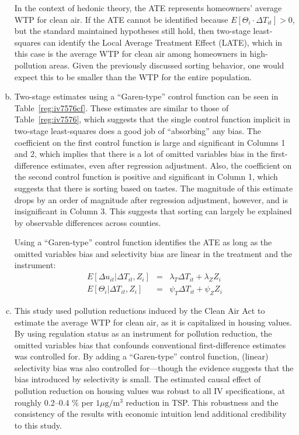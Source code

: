 \documentclass{article}
\begin{document}
\begin{enumerate}[(a)]
In the context of hedonic theory, the ATE represents homeowners' average WTP for clean air. If the ATE cannot be identified because $E\left[\Theta_{i} \cdot \Delta{}T_{it}\right]>0$, but the standard maintained hypotheses still hold, then two-stage least-squares can identify the Local Average Treatment Effect (LATE), which in this case is the average WTP for clean air among homeowners in high-pollution areas. Given the previously discussed sorting behavior, one would expect this to be smaller than the WTP for the entire population.

\item Two-stage estimates using a ``Garen-type'' control function can be seen in Table~\ref{reg:iv7576cf}. These estimates are similar to those of Table~\ref{reg:iv7576}, which suggests that the single control function implicit in two-stage least-squares does a good job of ``absorbing'' any bias. The coefficient on the first control function is large and significant in Columns 1 and 2, which implies that there is a lot of omitted variables bias in the first-difference estimates, even after regression adjustment. Also, the coefficient on the second control function is positive and significant in Column 1, which suggests that there is sorting based on tastes. The magnitude of this estimate drops by an order of magnitude after regression adjustment, however, and is insignificant in Column 3. This suggests that sorting can largely be explained by observable differences across counties.

Using a ``Garen-type'' control function identifies the ATE as long as the omitted variables bias and selectivity bias are linear in the treatment and the instrument:
\begin{eqnarray}
E\left[\Delta{}u_{it} | \Delta{}T_{it}, Z_{i}\right] &= &\lambda_{T}\Delta{}T_{it}+\lambda_{Z}Z_{i} \\
E\left[\Theta_{i} | \Delta{}T_{it}, Z_{i}\right] &= &\psi_{T}\Delta{}T_{it}+\psi_{Z}Z_{i}
\end{eqnarray}



\item This study used pollution reductions induced by the Clean Air Act to estimate the average WTP for clean air, as it is capitalized in housing values. By using regulation status as an instrument for pollution reduction, the omitted variables bias that confounds conventional first-difference estimates was controlled for. By adding a ``Garen-type'' control function, (linear) selectivity bias was also controlled for---though the evidence suggests that the bias introduced by selectivity is small. The estimated causal effect of pollution reduction on housing values was robust to all IV specifications, at roughly 0.2--0.4 \% per $1 \mu\text{g}/\text{m}^{3}$ reduction in TSP. This robustness and the consistency of the results with economic intuition lend additional credibility to this study.
\end{enumerate}
\end{document}
